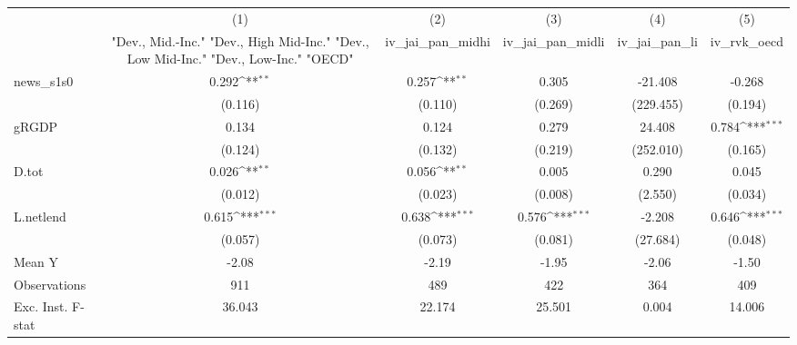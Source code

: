 {
\def\sym#1{\ifmmode^{#1}\else\(^{#1}\)\fi}
\begin{tabular}{l*{5}{c}}
\toprule
            &\multicolumn{1}{c}{(1)}&\multicolumn{1}{c}{(2)}&\multicolumn{1}{c}{(3)}&\multicolumn{1}{c}{(4)}&\multicolumn{1}{c}{(5)}\\
            &\multicolumn{1}{c}{ "Dev., Mid.-Inc." "Dev., High Mid-Inc." "Dev., Low Mid-Inc." "Dev., Low-Inc." "OECD" }&\multicolumn{1}{c}{iv\_jai\_pan\_midhi}&\multicolumn{1}{c}{iv\_jai\_pan\_midli}&\multicolumn{1}{c}{iv\_jai\_pan\_li}&\multicolumn{1}{c}{iv\_rvk\_oecd}\\
\midrule
news\_s1s0   &       0.292\sym{**} &       0.257\sym{**} &       0.305         &     -21.408         &      -0.268         \\
            &     (0.116)         &     (0.110)         &     (0.269)         &   (229.455)         &     (0.194)         \\
\addlinespace
gRGDP       &       0.134         &       0.124         &       0.279         &      24.408         &       0.784\sym{***}\\
            &     (0.124)         &     (0.132)         &     (0.219)         &   (252.010)         &     (0.165)         \\
\addlinespace
D.tot       &       0.026\sym{**} &       0.056\sym{**} &       0.005         &       0.290         &       0.045         \\
            &     (0.012)         &     (0.023)         &     (0.008)         &     (2.550)         &     (0.034)         \\
\addlinespace
L.netlend   &       0.615\sym{***}&       0.638\sym{***}&       0.576\sym{***}&      -2.208         &       0.646\sym{***}\\
            &     (0.057)         &     (0.073)         &     (0.081)         &    (27.684)         &     (0.048)         \\
\midrule
Mean Y      &       -2.08         &       -2.19         &       -1.95         &       -2.06         &       -1.50         \\
Observations&         911         &         489         &         422         &         364         &         409         \\
Exc. Inst. F-stat&      36.043         &      22.174         &      25.501         &       0.004         &      14.006         \\
\bottomrule
\end{tabular}
}
